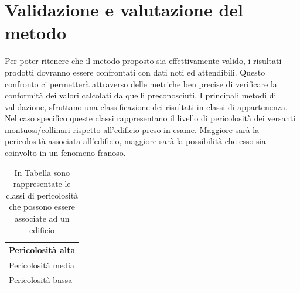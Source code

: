 
\chapter{Validazione e valutazione del metodo} %
Per poter ritenere che il metodo proposto sia effettivamente valido, i risultati prodotti dovranno essere confrontati con dati noti ed attendibili. Questo confronto ci permetterà attraverso delle metriche ben precise di verificare la conformità dei valori calcolati da quelli preconosciuti.
I principali metodi di validazione, sfruttano una classificazione dei risultati in classi di appartenenza. Nel caso specifico queste classi rappresentano il livello di pericolosità dei versanti montuosi/collinari rispetto all'edificio preso in esame.
Maggiore sarà la pericolosità associata all'edificio, maggiore sarà la possibilità che esso sia coinvolto in un fenomeno franoso.

\begin{table}[h]
	\centering
	\renewcommand{\arraystretch}{1.2}
	\begin{tabular}{|C{8cm}|}
		\hline
		
		{\large Pericolosità alta}                                       \\ \hline 
		{\large Pericolosità media} \\ \hline
		{\large Pericolosità bassa}                                               \\ \hline
	\end{tabular}
	\caption{In Tabella sono rappresentate le classi di pericolosità che possono essere associate ad un edificio}
	\label{tab:FasceRischio}
\end{table}


